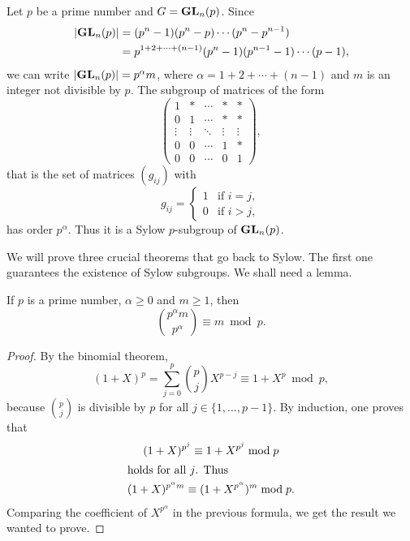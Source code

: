 \begin{example}
Let $p$ be a prime number and 
$G=\mathbf{GL}_n(p)$. Since 
\begin{align*}
|\mathbf{GL}_n(p)|&=(p^n-1)(p^n-p)\cdots (p^n-p^{n-1})\\
&=p^{1+2+\cdots+(n-1)}(p^n-1)(p^{n-1}-1)\cdots (p-1),
\end{align*}
we can write $|\mathbf{GL}_n(p)|=p^\alpha m$, where $\alpha=1+2+\cdots+(n-1)$ and $m$
is an integer not divisible by $p$. 
The subgroup of matrices of the form 
\[
\begin{pmatrix}
1 & * & \cdots & * &  *\\
0 & 1 & \cdots & * &  *\\
\vdots & \vdots & \ddots & \vdots & \vdots\\
0 & 0 & \cdots & 1 & *\\
0 & 0 & \cdots & 0 & 1
\end{pmatrix},
\]
that is the set of matrices $(g_{ij})$ with 
\[
g_{ij}=\begin{cases}
1 & \text{if $i=j$},\\
0 & \text{if $i>j$},
\end{cases}
\]
has order $p^\alpha$. Thus it is a Sylow $p$-subgroup of 
$\mathbf{GL}_n(p)$.
\end{example}

We will prove three crucial theorems that go back to Sylow. 
The first one guarantees the existence of Sylow subgroups. 
We shall need a lemma. 

\begin{lemma}
    If $p$ is a prime number, 
    $\alpha\geq0$ and $m\geq 1$, then 
    \[
        \binom{p^\alpha m}{p^\alpha}\equiv m\bmod p.
    \]
\end{lemma}

\begin{proof}
    By the binomial theorem,
        \[
        (1+X)^p=\sum_{j=0}^p\binom{p}{j}X^{p-j}\equiv 1+X^p\bmod p,
        \]
    because $\binom{p}{j}$ is divisible by $p$ for all
    $j\in\{1,\dots,p-1\}$.
    By induction, one proves that 
        \begin{gather*}
        (1+X)^{p^j}\equiv 1+X^{p^j}\bmod p      \\
        \shortintertext{holds for all $j$. Thus}
        (1+X)^{p^\alpha m}\equiv (1+X^{p^\alpha})^m\bmod p.
        \end{gather*}
Comparing the coefficient of $X^{p^\alpha}$ in the previous
formula, we get the result we wanted to prove.
\end{proof}

